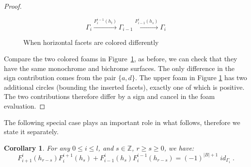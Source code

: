 \documentclass[12pt]{amsart}
\newtheorem{corollary}[theorem]{Corollary}
\theoremstyle{definition}
\theoremstyle{remark}
\numberwithin{equation}{section}
\numberwithin{figure}{section}
\newcommand{\Z}{\mathbb{Z}}
\DeclareMathOperator{\idfoam}{\mathit{id}}
\begin{document}
\begin{proof}
\begin{figure}[htbp]
    $$\Gamma_i\xrightarrow{F_i^{i-1}(h_t)}\Gamma_{i-1}\xrightarrow{F_{i-1}^i(h_s)}\Gamma_i$$
    \caption{When horizontal facets are colored differently}
    \label{fig:2colors}
  \end{figure}

  
  Compare the two colored foams in Figure~\ref{fig:2colors}, as before, we can check that they have the same monochrome and bichrome surfaces. The only difference in the sign contribution comes from the pair $\{a,d\}$. The upper foam in Figure \ref{fig:2colors} has two additional circles (bounding the inserted facets), exactly one of which is positive. The two contributions therefore differ by a sign and cancel in the foam evaluation.
\end{proof}

The following special case plays an important role in what follows, therefore we state it separately.

\begin{corollary}\label{cor:null homotopy without overline}
 For any $0\leq i\leq l$, and $s \in \Z$, $r \geq s\geq 0$, we have: 
  \begin{equation}
    F_{i+1}^i(h_{r-s})F_i^{i+1}(h_s)+F_{i-1}^i(h_s)F_i^{i-1}(h_{r-s})=(-1)^{|B|+1}\idfoam_{\Gamma_i}.
  \label{null-homotopyFormula}
  \end{equation}
\end{corollary}
\end{document}

